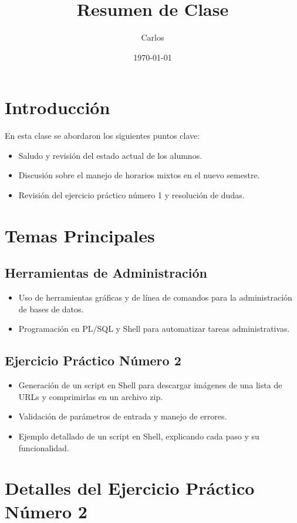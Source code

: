 \documentclass{article}
\title{Resumen de Clase}
\author{Carlos}
\date{\today}
\begin{document}
\maketitle

\section{Introducción}
En esta clase se abordaron los siguientes puntos clave:

\begin{itemize}
    \item Saludo y revisión del estado actual de los alumnos.
    \item Discusión sobre el manejo de horarios mixtos en el nuevo semestre.
    \item Revisión del ejercicio práctico número 1 y resolución de dudas.
\end{itemize}

\section{Temas Principales}

\subsection{Herramientas de Administración}
\begin{itemize}
    \item Uso de herramientas gráficas y de línea de comandos para la administración de bases de datos.
    \item Programación en PL/SQL y Shell para automatizar tareas administrativas.
\end{itemize}

\subsection{Ejercicio Práctico Número 2}
\begin{itemize}
    \item Generación de un script en Shell para descargar imágenes de una lista de URLs y comprimirlas en un archivo zip.
    \item Validación de parámetros de entrada y manejo de errores.
    \item Ejemplo detallado de un script en Shell, explicando cada paso y su funcionalidad.
\end{itemize}

\section{Detalles del Ejercicio Práctico Número 2}
\end{document}
